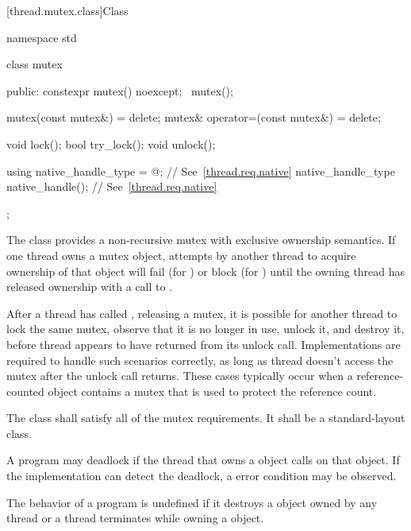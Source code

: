 [thread.mutex.class]{Class }

%
\begin{codeblock}
namespace std {
  class mutex {
  public:
    constexpr mutex() noexcept;
    ~mutex();

    mutex(const mutex&) = delete;
    mutex& operator=(const mutex&) = delete;

    void lock();
    bool try_lock();
    void unlock();

    using native_handle_type = @\impdefnc@; // See~\ref{thread.req.native}
    native_handle_type native_handle();                // See~\ref{thread.req.native}
  };
}
\end{codeblock}

\pnum
The class  provides a non-recursive mutex with exclusive ownership
semantics. If one thread owns a mutex object, attempts by another thread to acquire
ownership of that object will fail (for ) or block (for
) until the owning thread has released ownership with a call to
.

\pnum
\begin{note}
After a thread  has called , releasing a mutex, it is possible for another
thread  to lock the same mutex, observe that it is no longer in use, unlock it, and
destroy it, before thread  appears to have returned from its unlock call. Implementations
are required to handle such scenarios correctly, as long as thread  doesn't access the
mutex after the unlock call returns. These cases typically occur when a reference-counted object
contains a mutex that is used to protect the reference count.
\end{note}

\pnum
The class  shall satisfy all of the mutex
requirements. It shall be a standard-layout
class.

\pnum
\begin{note} A program may deadlock if the thread that owns a  object calls
 on that object. If the implementation can detect the deadlock,
a  error condition may be observed. \end{note}

\pnum
The behavior of a program is undefined if
it destroys a  object owned by any thread or
a thread terminates while owning a  object.

